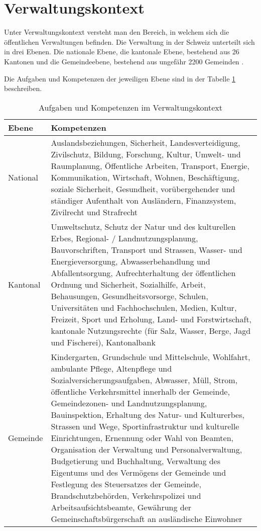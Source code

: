 \section{Verwaltungskontext}

Unter Verwaltungskontext versteht man den Bereich, in welchem sich die öffentlichen Verwaltungen befinden. Die Verwaltung in der Schweiz unterteilt sich in drei Ebenen. Die nationale Ebene, die kantonale Ebene, bestehend aus 26 Kantonen und die Gemeindeebene, bestehend aus ungefähr 2200 Gemeinden \parencite[S. 26-30]{HANDBOEFFVER}.

Die Aufgaben und Kompetenzen der jeweiligen Ebene sind in der Tabelle \ref{tab:aufgabenverwaltungsk} beschreiben. 

\begin{table}[h]
	\centering
\begin{tabular}{|p{2.5cm}|p{11.5cm}|}
  \hline
  \textbf{Ebene} & \textbf{Kompetenzen} \\ \hline
   National & Auslandsbeziehungen, Sicherheit, Landesverteidigung, Zivilschutz, Bildung, Forschung, Kultur, Umwelt- und Raumplanung, Öffentliche Arbeiten, Transport, Energie, Kommunikation, Wirtschaft, Wohnen, Beschäftigung, soziale Sicherheit, Gesundheit, vorübergehender und ständiger Aufenthalt von Ausländern, Finanzsystem, Zivilrecht und Strafrecht \\ \hline
   Kantonal & Umweltschutz, Schutz der Natur und des kulturellen Erbes, Regional- / Landnutzungsplanung, Bauvorschriften, Transport und Strassen, Wasser- und Energieversorgung, Abwasserbehandlung und Abfallentsorgung, Aufrechterhaltung der öffentlichen Ordnung und Sicherheit, Sozialhilfe, Arbeit, Behausungen, Gesundheitsvorsorge, Schulen, Universitäten und Fachhochschulen, Medien, Kultur, Freizeit, Sport und Erholung, Land- und Forstwirtschaft, kantonale Nutzungsrechte (für Salz, Wasser, Berge, Jagd und Fischerei), Kantonalbank\\ \hline
   Gemeinde & Kindergarten, Grundschule und Mittelschule, Wohlfahrt, ambulante Pflege, Altenpflege und Sozialversicherungsaufgaben, Abwasser, Müll, Strom, öffentliche Verkehrsmittel innerhalb der Gemeinde, Gemeindezonen- und Landnutzungsplanung, Bauinspektion, Erhaltung des Natur- und Kulturerbes, Strassen und Wege, Sportinfrastruktur und kulturelle Einrichtungen, Ernennung oder Wahl von Beamten, Organisation der Verwaltung und Personalverwaltung, Budgetierung und Buchhaltung, Verwaltung des Eigentums und des Vermögens der Gemeinde und Festlegung des Steuersatzes der Gemeinde, Brandschutzbehörden, Verkehrspolizei und Arbeitsaufsichtsbeamte, Gewährung der Gemeinschaftsbürgerschaft an ausländische Einwohner \\ \hline
  \end{tabular} 
	\caption{Aufgaben und Kompetenzen im Verwaltungskontext \parencite[S. 26-30]{HANDBOEFFVER}}
	\label{tab:aufgabenverwaltungsk}
\end{table}


